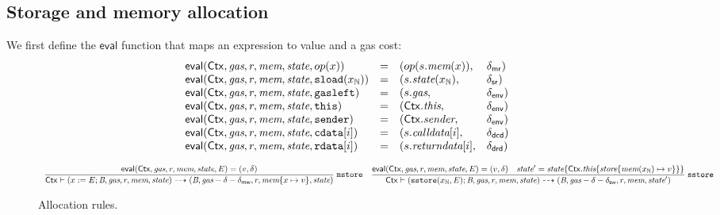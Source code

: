 \def\eval{\mathsf{eval}}
\subsection{Storage and memory allocation}
We first define the $\eval$ function that maps an expression to value and a gas cost:
$$
\begin{array}{llll}
    \eval(\ctx, \textit{gas},r,\memory,\state, op(x)) &=& 
    (op(s.\memory(x)),&\dmr) \\
    \eval(\ctx, \textit{gas},r,\memory,\state, \sload{x_\Nat}) &=& (s.\state(x_\Nat),&\dsr)\\
    \eval(\ctx, \textit{gas}, r,\memory,\state, \mathtt{gasleft}) &=& (s.\textit{gas},&\denv) \\
    \eval(\ctx,\textit{gas}, r,\memory,\state,\mathtt{this}) &=& (\ctx.\thisVal,&\denv) \\
    \eval(\ctx, \textit{gas}, r,\memory,\state, \mathtt{sender}) &=& (\ctx.\senderVal,&\denv) \\
    \eval(\ctx, \textit{gas}, r,\memory,\state,\bcd[i]) &=& (s.\callDataVal[i],&\dcd) \\
    \eval(\ctx, \textit{gas}, r,\memory,\state,\brd[i]) &=& (s.\returnDataVal[i],&\drd)
\end{array}
$$
\begin{figure}[ht]
$$
\begin{array}{c}
\dfrac{
\eval(\ctx,\textit{gas}, r,\memory,\state,E) = (v,\delta) 
}
{
\ctx\vdash 
(x:=E;\bytecode,\textit{gas}, r, \memory,\state) 
\rar 
(\bytecode,\textit{gas}-\delta-\delta_\mathsf{mw}, r,\memory\set{x\mapsto v},\state)
}\rlab{mstore}
\end{array}
\\\\
\begin{array}{c}
\dfrac{
\eval(\ctx,\textit{gas}, r,\memory,\state,E) = (v,\delta)
\quad
\state' = \state\set{\ctx.\thisVal\set{\store\set{\memory(x_\Nat)\mapsto v}}}
}
{
\ctx\vdash 
(\sstore{x_\Nat,E};\bytecode,\textit{gas}, r, \memory,\state) 
\rar 
(\bytecode,\textit{gas}-\delta-\delta_\mathsf{sw}, r,\memory,\state')
}\rlab{sstore}
\end{array}
$$
\caption{Allocation rules.}
\end{figure}